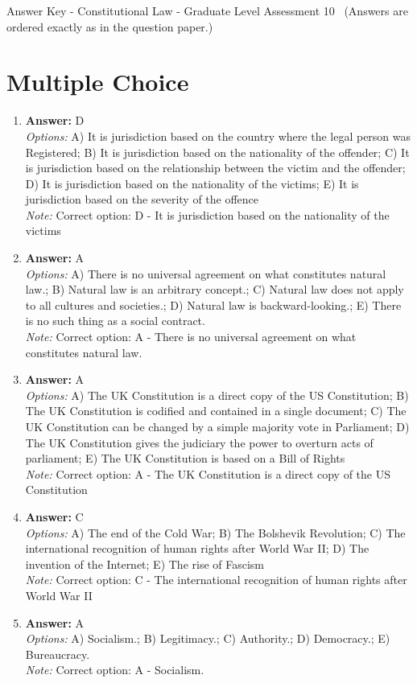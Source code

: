 \documentclass[12pt]{article}
\begin{document}
\begin{center}
Answer Key - Constitutional Law - Graduate Level Assessment 10 \
\small (Answers are ordered exactly as in the question paper.)
\end{center}

\section*{Multiple Choice}
\begin{enumerate}[label=\arabic*.]
\item \textbf{Answer:} D
\\ \textit{Options:} A) It is jurisdiction based on the country where the legal person was Registered; B) It is jurisdiction based on the nationality of the offender; C) It is jurisdiction based on the relationship between the victim and the offender; D) It is jurisdiction based on the nationality of the victims; E) It is jurisdiction based on the severity of the offence
\\ \textit{Note:} Correct option: D - It is jurisdiction based on the nationality of the victims
\item \textbf{Answer:} A
\\ \textit{Options:} A) There is no universal agreement on what constitutes natural law.; B) Natural law is an arbitrary concept.; C) Natural law does not apply to all cultures and societies.; D) Natural law is backward-looking.; E) There is no such thing as a social contract.
\\ \textit{Note:} Correct option: A - There is no universal agreement on what constitutes natural law.
\item \textbf{Answer:} A
\\ \textit{Options:} A) The UK Constitution is a direct copy of the US Constitution; B) The UK Constitution is codified and contained in a single document; C) The UK Constitution can be changed by a simple majority vote in Parliament; D) The UK Constitution gives the judiciary the power to overturn acts of parliament; E) The UK Constitution is based on a Bill of Rights
\\ \textit{Note:} Correct option: A - The UK Constitution is a direct copy of the US Constitution
\item \textbf{Answer:} C
\\ \textit{Options:} A) The end of the Cold War; B) The Bolshevik Revolution; C) The international recognition of human rights after World War II; D) The invention of the Internet; E) The rise of Fascism
\\ \textit{Note:} Correct option: C - The international recognition of human rights after World War II
\item \textbf{Answer:} A
\\ \textit{Options:} A) Socialism.; B) Legitimacy.; C) Authority.; D) Democracy.; E) Bureaucracy.
\\ \textit{Note:} Correct option: A - Socialism.
\end{enumerate}
\end{document}
